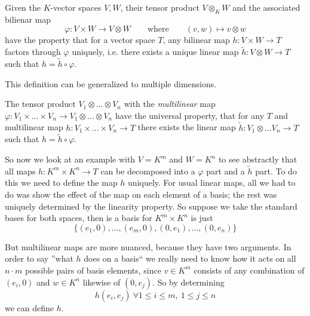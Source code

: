 \begin{definition}\label{def:uni_prop_tensor}
   Given the \(K\)-vector spaces \(V, W\), their tensor product \(V \otimes_K W\) and the associated bilienar map
   \[\varphi: V \times W \to V \otimes W \qquad\text{where}\qquad (v, w) \mapsto v \otimes w\]
   have the property that for a vector space \(T\), any bilinear map \(h: V \times W \to T\) factors through \(\varphi\) uniquely, i.e. there exists a unique linear map \(\tilde{h}: V \otimes W \to T\) such that \(h = \tilde{h} \circ \varphi\).
   \begin{center}
   \end{center}
\end{definition}
\begin{remark}
   This definition can be generalized to multiple dimensions.

   The tensor product \(V_1 \otimes \ldots \otimes V_n\) with the \emph{multilinear} map \(\varphi: V_1 \times \ldots \times V_n \to V_1 \otimes \ldots \otimes V_n\) have the universal property, that for any \(T\) and multilinear map \(h: V_1 \times \ldots \times V_n \to T\) there exists the linear map \(\tilde{h}: V_1 \otimes \ldots V_n \to T\) such that \(h = \tilde{h} \circ \varphi\).
\end{remark}

So now we look at an example with \(V = K^m\) and \(W = K^n\) to see abstractly that all maps \(h: K^m \times K^n \to T\) can be decomposed into a \(\varphi\) part and a \(\tilde{h}\) part.
To do this we need to define the map \(h\) uniquely.
For usual linear maps, all we had to do was show the effect of the map on each element of a basis; the rest was uniquely determined by the linearity property.
So suppose we take the standard bases for both spaces, then is a basis for \(K^m \times K^n\) is just
\[\{(e_1, 0), \ldots, (e_m, 0), (0, e_1), \ldots, (0, e_n)\}\]

But multilinear maps are more nuanced, because they have two arguments.
In order to say ''what \(h\) does on a basis`` we really need to know how it acts on all \(n \cdot m\) possible pairs of basis elements, since \(v \in K^m\) consists of any combination of \((e_i, 0)\) and \(w \in K^n\) likewise of \((0, e_j)\).
So by determining
\[h(e_i, e_j)~\forall 1 \leq i \leq m,~1 \leq j \leq n\]
we can define \(h\).

